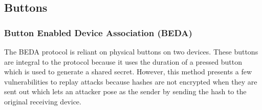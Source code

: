 

\subsection{Buttons}
\subsubsection{Button Enabled Device Association (BEDA)}
The BEDA protocol is reliant on physical buttons on two devices.
These buttons are integral to the protocol because it uses the duration of a pressed button which is used to generate a shared secret.
However, this method presents a few vulnerabilities to replay attacks because hashes are not encrypted when they are sent out which lets an attacker pose as the sender by sending the hash to the original receiving device.



